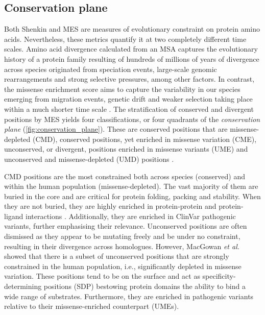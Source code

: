 \subsection{Conservation plane}

Both Shenkin and MES are measures of evolutionary constraint on protein amino acids. Nevertheless, these metrics quantify it at two completely different time scales. Amino acid divergence calculated from an MSA captures the evolutionary history of a protein family resulting of hundreds of millions of years of divergence across species originated from speciation events, large-scale genomic rearrangements and strong selective pressures, among other factors. In contrast, the missense enrichment score aims to capture the variability in our species emerging from migration events, genetic drift and weaker selection taking place within a much shorter time scale \cite{HUBLIN_2017_HUMAN}. The stratification of conserved and divergent positions by MES yields four classifications, or four quadrants of the \textit{conservation plane} (\autoref{fig:conservation_plane}). These are conserved positions that are missense-depleted (CMD), conserved positions, yet enriched in missense variation (CME), unconserved, or divergent, positions enriched in missense variants (UME) and unconserved and missense-depleted (UMD) positions \cite{MACGOWAN_2024_VARIANTS}.

CMD positions are the most constrained both across species (conserved) and within the human population (missense-depleted). The vast majority of them are buried in the core and are critical for protein folding, packing and stability. When they are not buried, they are highly enriched in protein-protein and protein-ligand interactions \cite{UTGES_2021_ANKS}. Additionally, they are enriched in ClinVar \cite{LANDRUM_2013_CLINVAR} pathogenic variants, further emphasising their relevance. Unconserved positions are often dismissed as they appear to be mutating freely and be under no constraint, resulting in their divergence across homologues. However, MacGowan \textit{et al.} \cite{MACGOWAN_2024_VARIANTS} showed that there is a subset of unconserved positions that are strongly constrained in the human population, i.e., significantly depleted in missense variation. These positions tend to be on the surface and act as specificity-determining positions (SDP) bestowing protein domains the ability to bind a wide range of substrates. Furthermore, they are enriched in pathogenic variants relative to their missense-enriched counterpart (UMEs).

